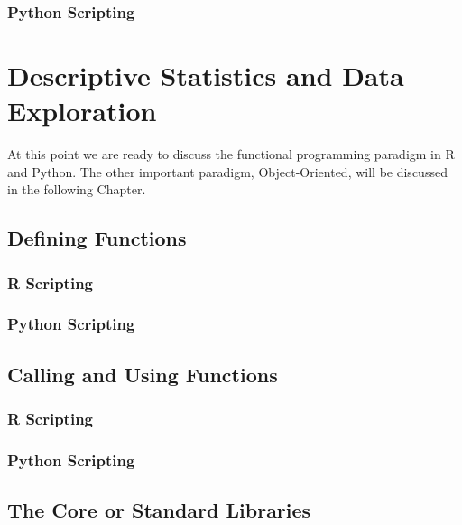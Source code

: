 \documentclass[]{book}
\theoremstyle{definition}
\theoremstyle{definition}
\theoremstyle{definition}
\theoremstyle{remark}
\begin{document}
\subsection{Python Scripting}\label{python-scripting-7}

\chapter{Descriptive Statistics and Data
Exploration}\label{descriptive-statistics-and-data-exploration}

At this point we are ready to discuss the functional programming
paradigm in R and Python. The other important paradigm, Object-Oriented,
will be discussed in the following Chapter.

 

\section{Defining Functions}\label{defining-functions-1}

\subsection{R Scripting}\label{r-scripting-7}

\subsection{Python Scripting}\label{python-scripting-8}

\section{Calling and Using
Functions}\label{calling-and-using-functions-1}

\subsection{R Scripting}\label{r-scripting-8}

\subsection{Python Scripting}\label{python-scripting-9}

\section{The Core or Standard
Libraries}\label{the-core-or-standard-libraries}
\end{document}
